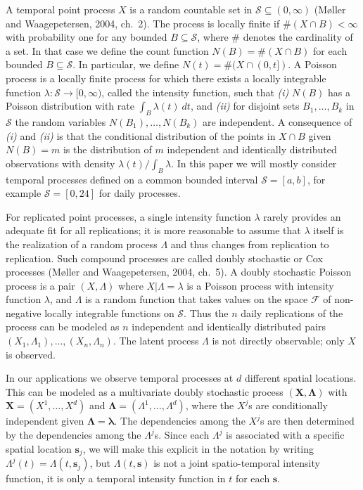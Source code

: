 \documentclass[titlepage,12pt]{article}
\renewcommand{\mathcal}{\mathscr}
\begin{document}
A temporal point process $X$ is a random countable set in $\mathcal{S}%
\subseteq (0,\infty )$ (M\o ller and Waagepetersen, 2004, ch.~2). The
process is locally finite if $\#(X\cap B)<\infty $ with probability one for
any bounded $B\subseteq \mathcal{S}$, where $\#$ denotes the cardinality of
a set. In that case we define the count function $N(B)=\#(X\cap B)$ for each
bounded $B\subseteq \mathcal{S}$. In particular, we define $N(t)=\#(X\cap
(0,t])$. A Poisson process is a locally finite process for which there
exists a locally integrable function $\lambda :\mathcal{S}\rightarrow
\lbrack 0,\infty )$, called the intensity function, such that \emph{(i)} $%
N(B)$ has a Poisson distribution with rate $\int_{B}\lambda (t)~dt$, and 
\emph{(ii)} for disjoint sets $B_{1},\ldots ,B_{k}$ in $\mathcal{S}$ the
random variables $N(B_{1}),\ldots ,N(B_{k})$ are independent. A consequence
of \emph{(i)} and \emph{(ii)} is that the conditional distribution of the
points in $X\cap B$ given $N(B)=m$ is the distribution of $m$ independent
and identically distributed observations with density $\lambda
(t)/\int_{B}\lambda $. In this paper we will mostly consider temporal
processes defined on a common bounded interval $\mathcal{S}=[a,b]$, for
example $\mathcal{S}=[0,24]$ for daily processes.

For replicated point processes, a single intensity function $\lambda $
rarely provides an adequate fit for all replications; it is more reasonable
to assume that $\lambda $ itself is the realization of a random process $%
\Lambda $ and thus changes from replication to replication. Such compound
processes are called doubly stochastic or Cox processes (M\o ller and
Waagepetersen, 2004, ch.~5). A doubly stochastic Poisson process is a pair $%
(X,\Lambda )$ where $X|\Lambda =\lambda $ is a Poisson process with
intensity function $\lambda $, and $\Lambda $ is a random function that
takes values on the space $\mathcal{F}$ of non-negative locally integrable
functions on $\mathcal{S}$. Thus the $n$ daily replications of the process
can be modeled as $n$ independent and identically distributed pairs $%
(X_{1},\Lambda _{1}),\ldots ,(X_{n},\Lambda _{n})$. The latent process $%
\Lambda $ is not directly observable; only $X$ is observed.

In our applications we observe temporal processes at $d$ different spatial
locations. This can be modeled as a multivariate doubly stochastic process $(%
\mathbf{X},\mathbf{\Lambda })$ with $\mathbf{X}=(X^{1},\ldots ,X^{d})$ and $%
\mathbf{\Lambda }=(\Lambda ^{1},\ldots ,\Lambda ^{d})$, where the $X^{j}$s
are conditionally independent given $\mathbf{\Lambda }=\mathbf{\lambda }$.
The dependencies among the $X^{j}$s are then determined by the dependencies
among the $\Lambda ^{j}$s. Since each $\Lambda ^{j}$ is associated with a
specific spatial location $\mathbf{s}_{j}$, we will make this explicit in
the notation by writing $\Lambda ^{j}(t)=\Lambda (t,\mathbf{s}_{j})$, but $%
\Lambda (t,\mathbf{s})$ is not a joint spatio-temporal intensity function,
it is only a temporal intensity function in $t$ for each $\mathbf{s}$.
\end{document}
